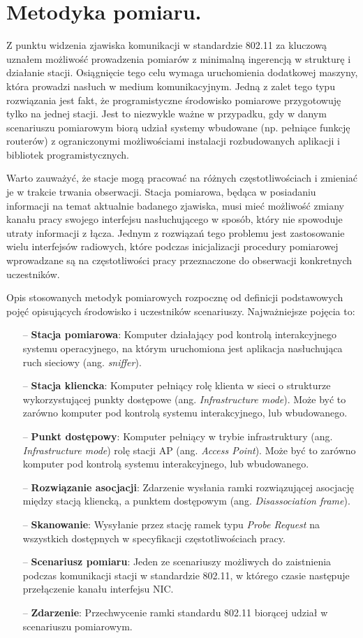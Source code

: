 \section{Metodyka pomiaru.}
Z punktu widzenia zjawiska komunikacji w standardzie 802.11 za kluczową uznałem możliwość prowadzenia pomiarów z minimalną ingerencją w strukturę i działanie stacji. Osiągnięcie tego celu wymaga uruchomienia dodatkowej maszyny, która prowadzi nasłuch w medium komunikacyjnym. Jedną z zalet tego typu rozwiązania jest fakt, że programistyczne środowisko pomiarowe przygotowuję tylko na jednej stacji. Jest to niezwykle ważne w przypadku, gdy w danym scenariuszu pomiarowym biorą udział systemy wbudowane (np. pełniące funkcję routerów) z ograniczonymi możliwościami instalacji rozbudowanych aplikacji i bibliotek programistycznych. 

Warto zauważyć, że stacje mogą pracować na różnych częstotliwościach i zmieniać je w trakcie trwania obserwacji. Stacja pomiarowa, będąca w posiadaniu informacji na temat aktualnie badanego zjawiska, musi mieć możliwość zmiany kanału pracy swojego interfejsu nasłuchującego w sposób, który nie spowoduje utraty informacji z łącza. Jednym z rozwiązań tego problemu jest zastosowanie wielu interfejsów radiowych, które podczas inicjalizacji procedury pomiarowej wprowadzane są na częstotliwości pracy przeznaczone do obserwacji konkretnych uczestników. 

Opis stosowanych metodyk pomiarowych rozpocznę od definicji podstawowych pojęć opisujących środowisko i uczestników scenariuszy. Najważniejsze pojęcia to:
\begin{itemize}
\item[--] {\bf Stacja pomiarowa}: Komputer działający pod kontrolą interakcyjnego systemu operacyjnego, na którym uruchomiona jest aplikacja nasłuchująca ruch sieciowy (ang. \emph{sniffer}).
\item[--] {\bf Stacja kliencka}: Komputer pełniący rolę klienta w sieci o strukturze wykorzystującej punkty dostępowe (ang. \emph{Infrastructure mode}). Może być to zarówno komputer pod kontrolą systemu interakcyjnego, lub wbudowanego.
\item[--] {\bf Punkt dostępowy}: Komputer pełniący w trybie infrastruktury (ang. \emph{Infrastructure mode}) rolę stacji AP (ang. \emph{Access Point}). Może być to zarówno komputer pod kontrolą systemu interakcyjnego, lub wbudowanego.
\item[--] {\bf Rozwiązanie asocjacji}: Zdarzenie wysłania ramki rozwiązującej asocjację między stacją kliencką, a punktem dostępowym (ang. \emph{Disassociation frame}).
\item[--] {\bf Skanowanie}: Wysyłanie przez stację ramek typu \emph{Probe Request} na wszystkich dostępnych w specyfikacji \cite{std:IEEE80211} częstotliwościach pracy.
\item[--] {\bf Scenariusz pomiaru}: Jeden ze scenariuszy możliwych do zaistnienia podczas komunikacji stacji w standardzie 802.11, w którego czasie następuje przełączenie kanału interfejsu NIC.
\item[--] {\bf Zdarzenie}: Przechwycenie ramki standardu 802.11 biorącej udział w scenariuszu pomiarowym. 
\end{itemize}

